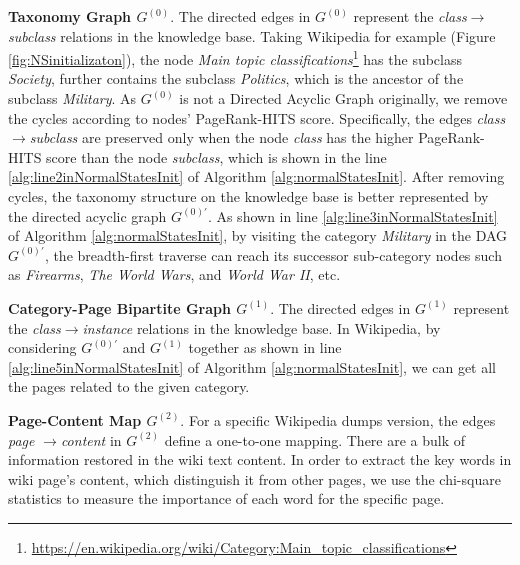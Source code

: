 \documentclass[runningheads,a4paper]{llncs}
\theoremstyle{exampstyle}
\begin{document}
\textbf{Taxonomy Graph \(G^{(0)}\)}. The directed edges in \(G^{(0)}\) represent the \textit{class}\(\rightarrow\)\textit{subclass} relations in the knowledge base. 
Taking Wikipedia for example (Figure \ref{fig:NSinitializaton}), the node \textit{Main topic classifications}\footnote{\url{https://en.wikipedia.org/wiki/Category:Main_topic_classifications}} has the subclass \textit{Society}, further contains the subclass \textit{Politics}, which is the ancestor of the subclass \textit{Military}.
As \(G^{(0)}\) is not a Directed Acyclic Graph originally\cite{faralli2015large}, we remove the cycles according to nodes' PageRank-HITS\cite{Yan:2015wq} score.
Specifically, the edges \textit{class}\(\rightarrow\)\textit{subclass} are preserved only when the node \textit{class} has the higher PageRank-HITS score than the node \textit{subclass}, which is shown in the line \ref{alg:line2inNormalStatesInit} of Algorithm \ref{alg:normalStatesInit}.
After removing cycles, the taxonomy structure on the knowledge base is better represented by the directed acyclic graph \(G^{(0)'}\).
As shown in line \ref{alg:line3inNormalStatesInit} of Algorithm \ref{alg:normalStatesInit}, by visiting the category \textit{Military} in the DAG \(G^{(0)'}\), the breadth-first traverse can reach its successor sub-category nodes such as \textit{Firearms}, \textit{The World Wars}, and \textit{World War II}, etc. 

\textbf{Category-Page Bipartite Graph \(G^{(1)}\)}. 
The directed edges in \(G^{(1)}\) represent the \textit{class}\(\rightarrow\)\textit{instance} relations in the knowledge base.
In Wikipedia, by considering \(G^{(0)'}\) and \(G^{(1)}\) together as shown in line \ref{alg:line5inNormalStatesInit} of Algorithm \ref{alg:normalStatesInit}, we can get all the pages related to the given category. 

\textbf{Page-Content Map \(G^{(2)}\)}. 
For a specific Wikipedia dumps version, the edges  \textit{page} \(\rightarrow\)\textit{content} in \(G^{(2)}\) define a one-to-one mapping.
There are a bulk of information restored in the wiki text content.
In order to extract the key words in wiki page's content, which distinguish it from other pages, we use the chi-square statistics\cite{yang1997comparative}\cite{liu2009imbalanced} to measure the importance of each word for the specific page.
\end{document}
